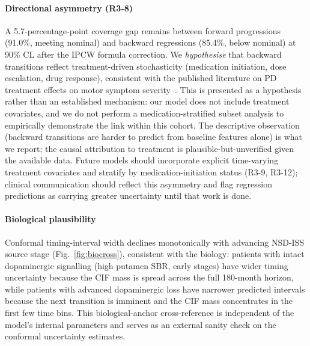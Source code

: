 \documentclass[11pt]{article}
\begin{document}
\paragraph*{Directional asymmetry (R3-8)} A 5.7-percentage-point coverage gap remains between forward progressions (91.0\%, meeting nominal) and backward regressions (85.4\%, below nominal) at 90\% CL after the IPCW formula correction. We \emph{hypothesise} that backward transitions reflect treatment-driven stochasticity (medication initiation, dose escalation, drug response), consistent with the published literature on PD treatment effects on motor symptom severity~\cite{espay2025refutation,tomlinson2010systematic}. This is presented as a hypothesis rather than an established mechanism: our model does not include treatment covariates, and we do not perform a medication-stratified subset analysis to empirically demonstrate the link within this cohort. The descriptive observation (backward transitions are harder to predict from baseline features alone) is what we report; the causal attribution to treatment is plausible-but-unverified given the available data. Future models should incorporate explicit time-varying treatment covariates and stratify by medication-initiation status (R3-9, R3-12); clinical communication should reflect this asymmetry and flag regression predictions as carrying greater uncertainty until that work is done.

\paragraph*{Biological plausibility} Conformal timing-interval width declines monotonically with advancing NSD-ISS source stage (Fig.~\ref{fig:biocross}), consistent with the biology: patients with intact dopaminergic signalling (high putamen SBR, early stages) have wider timing uncertainty because the CIF mass is spread across the full 180-month horizon, while patients with advanced dopaminergic loss have narrower predicted intervals because the next transition is imminent and the CIF mass concentrates in the first few time bins. This biological-anchor cross-reference is independent of the model's internal parameters and serves as an external sanity check on the conformal uncertainty estimates.
\end{document}
